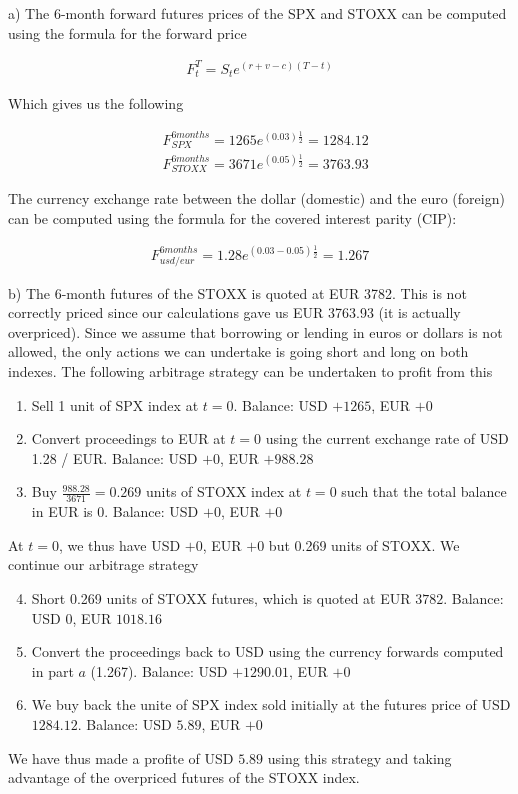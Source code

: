 \documentclass[10pt]{article}
\newenvironment{exercise}[2][Exercise]{\begin{trivlist}
  \item[\hskip \labelsep {\bfseries #1}\hskip \labelsep {\bfseries #2.}]}{\end{trivlist}}
\begin{document}
\newpage

\begin{exercise} 2
\end{exercise}

a) The 6-month forward futures prices of the SPX and STOXX can be computed using the formula for the  forward price

\begin{align*}
	F_t^T = S_te^{(r + v - c)(T - t)}
\end{align*}

Which gives us the following

\begin{align*}
	&F_{SPX}^{6months} = 1265 e^{(0.03)\frac{1}{2}} = 1284.12 \\
	&F_{STOXX}^{6months} = 3671 e^{(0.05)\frac{1}{2}} = 3763.93
\end{align*}

The currency exchange rate between the dollar (domestic) and the euro (foreign) can be computed using the formula for the covered interest parity (CIP):

\begin{align*}
	F_{usd/eur}^{6months} = 1.28 e^{(0.03 - 0.05)\frac{1}{2}} = 1.267
\end{align*}

b) The 6-month futures of the STOXX is quoted at EUR 3782. This is not correctly priced since our calculations gave us EUR 3763.93 (it is actually overpriced). Since we assume that borrowing or lending in euros or dollars is not allowed,  the only actions we can undertake is going short and long on both indexes. The following arbitrage strategy can be undertaken to profit from this

\begin{enumerate}
	\item Sell 1 unit of SPX index at $t = 0$. Balance: USD $+1265$, EUR $+0$
	\item Convert proceedings to EUR at $t=0$ using the current exchange rate of USD 1.28 / EUR. Balance: USD $+0$, EUR $+988.28$
	\item Buy $\frac{988.28}{3671} = 0.269$ units of STOXX index at $t = 0$ such that the total balance in EUR is 0. Balance: USD $+0$,  EUR $+0$
\end{enumerate}

At $t = 0$, we thus have USD $+0$, EUR $+0$ but  0.269 units of STOXX. We continue our arbitrage strategy

\begin{enumerate}
	\setcounter{enumi}{3}
	\item Short 0.269 units of STOXX futures, which is quoted at EUR $3782$.  Balance: USD $0$, EUR $1018.16$
	\item Convert the proceedings back to USD using the currency forwards computed in part $a$ (1.267). Balance: USD $+1290.01$, EUR $+0$
	\item We buy back the unite of SPX index sold initially at the futures price of USD $1284.12$. Balance: USD $5.89$, EUR $+0$  
\end{enumerate}

We have thus made a profite of USD $5.89$ using this strategy and taking advantage of the overpriced futures of the STOXX index. 
\end{document}

